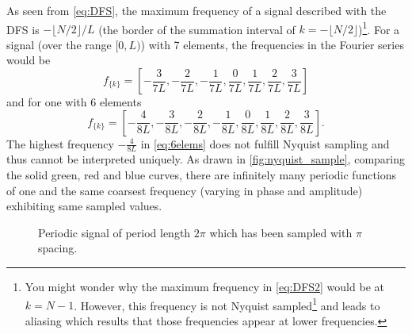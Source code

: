 \documentclass{juliacon}
\begin{document}
    As seen from \autoref{eq:DFS}, the maximum frequency of a signal described with the DFS is $-\lfloor N/2 \rfloor / L$ (the border of the summation interval of $k = -\lfloor N/2 \rfloor$)\footnote{You might wonder why the maximum frequency in \autoref{eq:DFS2} would be at $k=N-1$. However, this frequency is not Nyquist sampled\footnote{According to the Whittaker–Nyquist–Shannon 
        theorem \cite{whittaker_e_t_1915_1428702}, \cite{Shannon1949}.} and leads to aliasing which results that those frequencies appear at lower frequencies.}. 
    For a signal (over the range $[0, L)$) with 7 elements, the frequencies in the Fourier series would be
    \begin{equation}
        f_{\{k\}} = \left[-\frac{3}{7 L} , -\frac{2}{7 L},  -\frac{1}{7L}, \frac{0}{7L}, \frac{1}{7L}, \frac{2}{7L}, \frac{3}{7L} \right]
        \label{eq:7elems}
    \end{equation}
    and for one with 6 elements
    \begin{equation}
       f_{\{k\}} = \left[-\frac{4}{8 L} ,-\frac{3}{8 L} ,-\frac{2}{8 L} ,-\frac{1}{8 L} ,\frac{0}{8 L} ,\frac{1}{8 L} ,\frac{2}{8 L} ,\frac{3}{8 L} \right].
       \label{eq:6elems}
    \end{equation}
    The highest frequency $-\frac{4}{8 L}$ in \autoref{eq:6elems} does not fulfill Nyquist sampling and thus 
    cannot be interpreted uniquely. As drawn in \autoref{fig:nyquist_sample}, comparing the solid green, red and blue curves, there are infinitely many periodic functions of one and the same coarsest frequency
     (varying in phase and amplitude) exhibiting same sampled values.
    \begin{figure}
        \centering
        \caption{Periodic signal of period length $2\pi$ which has been sampled with $\pi$ spacing.}
        \label{fig:nyquist_sample}
    \end{figure}
\end{document}
